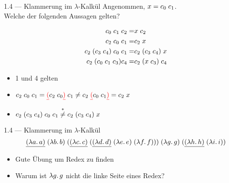 \documentclass{beamer}
\begin{document}
\setcounter{equation}{0}

\begin{frame}{1.4 --- Klammerung im $\lambda$-Kalkül}
	Angenommen, $x = c_0\;{}c_1$.\\
	Welche der folgenden Aussagen gelten?

	\begin{eqnarray}
		c_0\;{}c_1\;{}c_2                 =& x\;{}c_2 \\
		c_2\;{}c_0\;{}c_1                 =& c_2\;{}x \\
		c_2\;{}(c_3\;{}c_4)\;{}c_0\;{}c_1  =& c_2\;{}(c_3\;{}c_4)\;{}x \\
		c_2\;{}(c_0\;{}c_1\;{}c_3){c_4} =& c_2\;{}(x\;{}c_3)\;{}c_4
	\end{eqnarray}

	\pause

	\begin{itemize}
		\item 1 und 4 gelten
		\item $c_2\;{}c_0\;{}c_1 = \textcolor{red}{\underline{(}}c_2\;{}c_0\textcolor{red}{\underline{)}}\;{}c_1 \neq c_2\;{}\textcolor{red}{\underline{(}}c_0\;{}c_1\textcolor{red}{\underline{)}} = c_2\;{}x$
		\item $c_2\;{}(c_3\;{}c_4)\;{}c_0\;{}c_1 \stackrel{*}{\neq} c_2\;{}(c_3\;{}c_4)\;{}x$
	\end{itemize}
\end{frame}

\begin{frame}{1.4 --- Klammerung im $\lambda$-Kalkül}
    \begin{equation*}
        \app{\app{\app{\app{\uline{(\lam{a}{a})}}{(\lam{b}{b})}}{(\app{\uline{(\lam{c}{c})}}{(\appp{\uline{(\lam{d}{d})}}{(\lam{e}{e})}{(\lam{f}{f})})})}}{(\lam{g}{g})}}{(\app{\uline{(\lam{h}{h})}}{(\lam{i}{i})})}
    \end{equation*}

    \begin{itemize}
        \item Gute Übung um Redex zu finden
        \item Warum ist $\lambda g.\, g$ nicht die linke Seite eines Redex?
    \end{itemize}
\end{frame}
\end{document}
